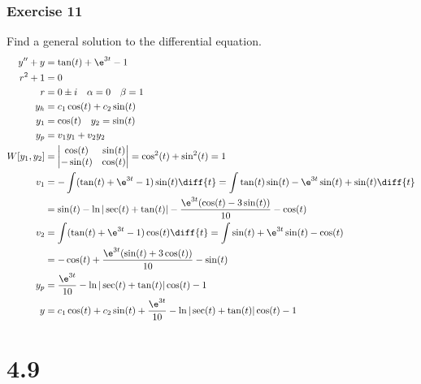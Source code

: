 \documentclass{math}
\begin{document}
\subsubsection*{Exercise 11}
Find a general solution to the differential equation.
\begin{align*}
  y''+y &= \tan(t)+\e^{3t}-1 \\
  r^2+1 &= 0 \\
  r &= 0\pm i \quad \alpha = 0 \quad \beta = 1 \\
  y_h &= c_1\cos(t)+c_2\sin(t) \\
  y_1 &= \cos(t) \quad y_2 = \sin(t) \\
  y_p &= v_1y_1+v_2y_2 \\
  W[y_1,y_2] &= \begin{vmatrix}
    \cos(t) & \sin(t) \\
    -\sin(t) & \cos(t)
  \end{vmatrix} = \cos^2(t)+\sin^2(t) = 1 \\
  v_1 &= -\int(\tan(t)+\e^{3t}-1)\sin(t)\diff{t} =
    \int\tan(t)\sin(t)-\e^{3t}\sin(t)+\sin(t)\diff{t} \\
  &= \sin(t)-\ln|\sec(t)+\tan(t)|-\frac{\e^{3t}(\cos(t)-3\sin(t))}{10}-
    \cos(t) \\
  v_2 &= \int(\tan(t)+\e^{3t}-1)\cos(t)\diff{t} =
    \int\sin(t)+\e^{3t}\sin(t)-\cos(t) \\
  &= -\cos(t)+\frac{\e^{3t}(\sin(t)+3\cos(t))}{10}-\sin(t) \\
  y_p &= \frac{\e^{3t}}{10}-\ln|\sec(t)+\tan(t)|\cos(t)-1 \\
  y &= c_1\cos(t)+c_2\sin(t)+\frac{\e^{3t}}{10}-\ln|\sec(t)+\tan(t)|\cos(t)-1
\end{align*}

\section*{4.9}
\end{document}
